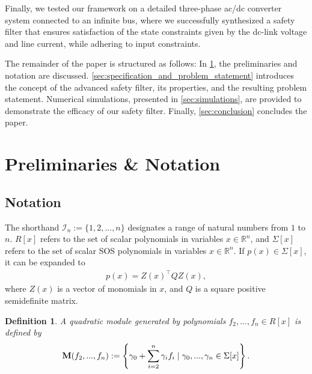 \documentclass[lettersize,journal]{IEEEtran}
\newcommand{\R}{\mathbb{R}}
\newtheorem{definition}{Definition}
\newcommand{\afterReviewChangedBox}[1]{{\color{orange}#1}}
\begin{document}
Finally, we tested our framework on a detailed three-phase ac/dc converter system connected to an infinite bus, where we successfully synthesized a safety filter that ensures satisfaction of the state constraints given by the dc-link voltage and line current, while adhering to input constraints.

The remainder of the paper is structured as follows: 
In \cref{sec:preliminaries}, the preliminaries and notation are discussed.
\cref{sec:specification_and_problem_statement} introduces the concept of the advanced safety filter, its properties, and the resulting problem statement.
Numerical simulations, presented in \cref{sec:simulations}, are provided to demonstrate the efficacy of our safety filter.
Finally, \cref{sec:conclusion} concludes the paper.






\section{Preliminaries \& Notation} \label{sec:preliminaries}

\subsection{Notation}

The shorthand $\mathcal I_n := \lbrace 1, 2, ..., n \rbrace$ designates a range of natural numbers from $1$ to $n$.
$R[x]$ refers to the set of scalar polynomials in variables $x \in \R^n$, and $\Sigma[x]$ refers to the set of scalar SOS polynomials in variables $x \in \R^n$. 
If $p(x) \in \Sigma[x]$, it can be expanded to
\begin{align} \label{eq:quadratic_matrix_form}
   p(x) = Z(x)^\top Q Z(x),
\end{align}
where $Z(x)$ is a vector of monomials in $x$, and $Q$ is a square positive semidefinite matrix.
\afterReviewChangedBox{\begin{definition}
   A \emph{quadratic module} generated by polynomials $f_2, ..., f_n \in R[x]$ is defined by
   \begin{align} \label{eq:quadratic_module}
      \textbf M(f_2, ..., f_n) := \left \{ \gamma_0 + \sum_{i=2}^n \gamma_i f_i \mid \gamma_0, ..., \gamma_n \in \Sigma[x] \right \}.
   \end{align}
\end{definition}}
\end{document}
